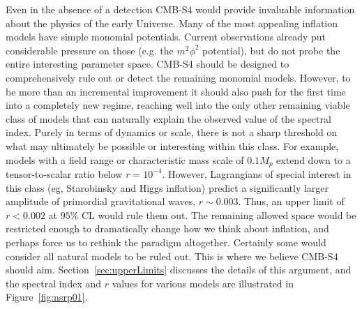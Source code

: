 
Even in the absence of a detection CMB-S4 would provide invaluable information about the physics of the early Universe. Many of the most appealing inflation models have simple monomial potentials. Current observations already put considerable pressure on those (e.g. the $m^2\phi^2$ potential), but do not probe the entire interesting parameter space. CMB-S4 should be designed to comprehensively rule out or detect the remaining monomial models. However, to be more than an incremental improvement it should also push for the first time into a completely new regime, reaching well into the only other remaining viable class of models that can naturally explain the observed value of the spectral index. Purely in terms of dynamics or scale, there is not a sharp threshold on what may ultimately be possible or interesting within this class. For example, models with a field range or characteristic mass scale of $0.1 M_p$ extend down to a tensor-to-scalar ratio below $r=10^{-4}$. However, Lagrangians of special interest in this class (eg, Starobinsky and Higgs inflation) predict a significantly larger amplitude of primordial gravitational waves, $r\sim0.003$. Thus, an upper limit of $r<0.002$ at $95\%$ CL would rule them out. The remaining allowed space would be restricted enough to dramatically change how we think about inflation, and perhaps force us to rethink the paradigm altogether. Certainly some would consider all natural models to be ruled out. This is where we believe CMB-S4 should aim. Section~\ref{sec:upperLimits} discusses the details of this argument, and the spectral index and $r$ values for various models are illustrated in Figure~\ref{fig:nsrp01}.


